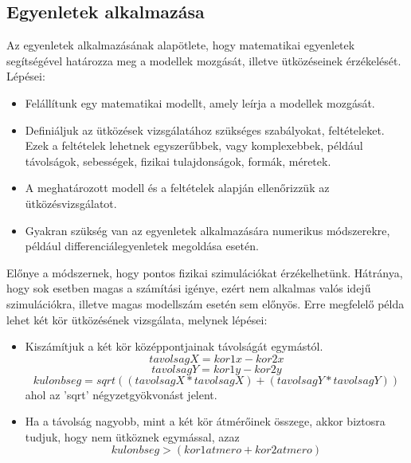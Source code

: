 \newpage
\subsection{Egyenletek alkalmazása}
Az egyenletek alkalmazásának alapötlete, hogy matematikai egyenletek segítségével határozza meg a modellek mozgását, illetve ütközéseinek érzékelését.
\\
Lépései:
\begin{itemize}
\item Felállítunk egy matematikai modellt, amely leírja a modellek mozgását.

\item Definiáljuk az ütközések vizsgálatához szükséges szabályokat, feltételeket. Ezek a feltételek lehetnek egyszerűbbek, vagy komplexebbek, például távolságok, sebességek, fizikai tulajdonságok, formák, méretek.

\item A meghatározott modell és a feltételek alapján ellenőrizzük az ütközésvizsgálatot.\

\item Gyakran szükség van az egyenletek alkalmazására numerikus módszerekre, például differenciálegyenletek megoldása esetén.
\end{itemize}
Előnye a módszernek, hogy pontos fizikai szimulációkat érzékelhetünk. Hátránya, hogy sok esetben magas a számítási igénye, ezért nem alkalmas valós idejű szimulációkra, illetve magas modellszám esetén sem előnyös. Erre megfelelő példa lehet két kör ütközésének vizsgálata, melynek lépései:

\begin{itemize}
	\item Kiszámítjuk a két kör középpontjainak távolságát egymástól.
	$$tavolsagX = kor1x - kor2x $$
	$$tavolsagY = kor1y - kor2y$$
	$$kulonbseg = sqrt( ( tavolsagX * tavolsagX ) + ( tavolsagY * tavolsagY ) )$$
	ahol az 'sqrt' négyzetgyökvonást jelent.
	\item  Ha a távolság nagyobb, mint a két kör átmérőinek összege, akkor biztosra tudjuk, hogy nem ütköznek egymással, azaz
	$$kulonbseg > ( kor1atmero + kor2atmero )$$
\end{itemize}